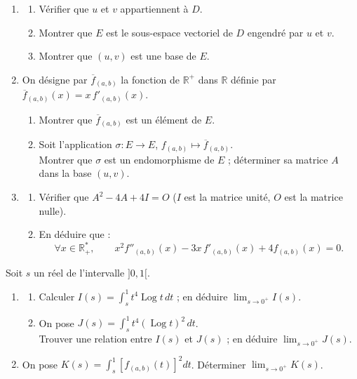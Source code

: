 \documentclass{axiobac}
\begin{document}
\begin{probleme}{}
\begin{enumerate}
    \item
    \begin{enumerate}
        \item Vérifier que $u$ et $v$ appartiennent à $D$.
        \item Montrer que $E$ est le sous-espace vectoriel de $D$ engendré par $u$ et $v$.
        \item Montrer que $(u, v)$ est une base de $E$.
    \end{enumerate}
    \item On désigne par $\overline{f}_{(a,b)}$ la fonction de $\mathbb{R}^+$ dans $\mathbb{R}$ définie par $\overline{f}_{(a,b)}(x) = x\,f'_{(a,b)}(x)$.
    \begin{enumerate}
        \item Montrer que $\overline{f}_{(a,b)}$ est un élément de $E$.
        \item Soit l'application $\sigma : E \longrightarrow E$, $f_{(a,b)} \longmapsto \overline{f}_{(a,b)}$. \\
        Montrer que $\sigma$ est un endomorphisme de $E$ ; déterminer sa matrice $A$ dans la base $(u, v)$.
    \end{enumerate}
    \item
    \begin{enumerate}
        \item Vérifier que $A^2 - 4A + 4I = O$ ($I$ est la matrice unité, $O$ est la matrice nulle).
        \item En déduire que :
        \[
        \forall x \in \mathbb{R}^*_+, \qquad x^2 f''_{(a,b)}(x) - 3x\,f'_{(a,b)}(x) + 4 f_{(a,b)}(x) = 0 .
        \]
    \end{enumerate}
\end{enumerate}


Soit $s$ un réel de l'intervalle $]0, 1[$.

\begin{enumerate}
    \item
    \begin{enumerate}
        \item Calculer $I(s) = \displaystyle\int_s^1 t^4 \operatorname{Log} t \, dt$ ; en déduire $\displaystyle\lim_{s \to 0^+} I(s)$.
        \item On pose $J(s) = \displaystyle\int_s^1 t^4 (\operatorname{Log} t)^2 \, dt$. \\
        Trouver une relation entre $I(s)$ et $J(s)$ ; en déduire $\displaystyle\lim_{s \to 0^+} J(s)$.
    \end{enumerate}
    \item On pose $K(s) = \displaystyle\int_s^1 \left[ f_{(a,b)}(t) \right]^2 dt$. Déterminer $\displaystyle\lim_{s \to 0^+} K(s)$.
\end{enumerate}

\end{probleme}
\end{document}

